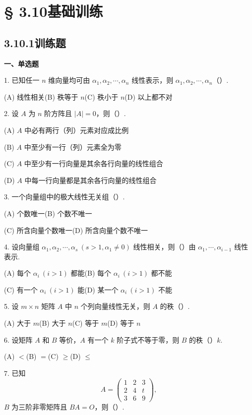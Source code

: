 \documentclass[UTF8,12pt,a4paper,fontset=fandol]{ctexart}
\begin{document}
\section*{§ 3.10\quad 基础训练}

\subsection*{3.10.1\quad 训练题}

\noindent\textbf{一、单选题}

1. 已知任一 $n$ 维向量均可由 $\alpha_1,\alpha_2,\cdots,\alpha_n$ 线性表示，则 $\alpha_1,\alpha_2,\cdots,\alpha_n$（\quad）.

(A) 线性相关\qquad (B) 秩等于 $n$\qquad (C) 秩小于 $n$\qquad (D) 以上都不对

2. 设 $A$ 为 $n$ 阶方阵且 $|A|=0$，则（\quad）.

(A) $A$ 中必有两行（列）元素对应成比例

(B) $A$ 中至少有一行（列）元素全为零

(C) $A$ 中至少有一行向量是其余各行向量的线性组合

(D) $A$ 中每一行向量都是其余各行向量的线性组合

3. 一个向量组中的极大线性无关组（\quad）.

(A) 个数唯一\qquad (B) 个数不唯一

(C) 所含向量个数唯一\qquad (D) 所含向量个数不唯一

4. 设向量组 $\alpha_1,\alpha_2,\cdots,\alpha_s\ (s>1,\alpha_1\ne 0)$ 线性相关，则（\quad）由 $\alpha_1,\cdots,\alpha_{i-1}$ 线性表示.

(A) 每个 $\alpha_i\ (i>1)$ 都能\qquad (B) 每个 $\alpha_i\ (i>1)$ 都不能

(C) 有一个 $\alpha_i\ (i>1)$ 能\qquad (D) 某一个 $\alpha_i\ (i>1)$ 不能

5. 设 $m\times n$ 矩阵 $A$ 中 $n$ 个列向量线性无关，则 $A$ 的秩（\quad）.

(A) 大于 $m$\qquad (B) 大于 $n$\qquad (C) 等于 $m$\qquad (D) 等于 $n$

6. 设矩阵 $A$ 和 $B$ 等价，$A$ 有一个 $k$ 阶子式不等于零，则 $B$ 的秩（\quad）$k$.

(A) $<$\qquad (B) $=$\qquad (C) $\ge$\qquad (D) $\le$

7. 已知
\[
A=\begin{pmatrix}
1&2&3\\
2&4&t\\
3&6&9
\end{pmatrix},
\]
$B$ 为三阶非零矩阵且 $BA=O$，则（\quad）.
\end{document}

